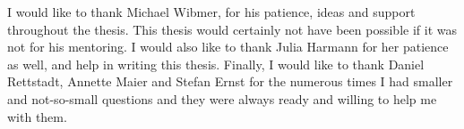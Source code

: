 I would like to thank Michael Wibmer, for his patience, ideas and support throughout the thesis. This thesis would certainly not have been possible if it was not for his mentoring.
I would also like to thank Julia Harmann for her patience as well, and help in writing this thesis.
Finally, I would like to thank Daniel Rettstadt, Annette Maier and Stefan Ernst for the numerous times I had smaller and not-so-small questions and they were always ready and willing to help me with them.
